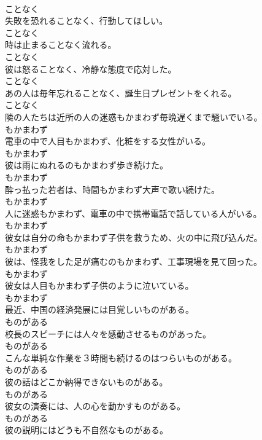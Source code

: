 \documentclass[8pt]{extreport}
\begin{document}
\begin{CJK}{UTF8}{min}
\\	ことなく
\\	失敗を恐れることなく、行動してほしい。	
\\	ことなく
\\	時は止まることなく流れる。	
\\	ことなく
\\	彼は怒ることなく、冷静な態度で応対した。	
\\	ことなく
\\	あの人は毎年忘れることなく、誕生日プレゼントをくれる。	
\\	ことなく
\\	隣の人たちは近所の人の迷惑もかまわず毎晩遅くまで騒いでいる。	
\\	もかまわず
\\	電車の中で人目もかまわず、化粧をする女性がいる。	
\\	もかまわず
\\	彼は雨にぬれるのもかまわず歩き続けた。	
\\	もかまわず
\\	酔っ払った若者は、時間もかまわず大声で歌い続けた。	
\\	もかまわず
\\	人に迷惑もかまわず、電車の中で携帯電話で話している人がいる。	
\\	もかまわず
\\	彼女は自分の命もかまわず子供を救うため、火の中に飛び込んだ。	
\\	もかまわず
\\	彼は、怪我をした足が痛むのもかまわず、工事現場を見て回った。	
\\	もかまわず
\\	彼女は人目もかまわず子供のように泣いている。	
\\	もかまわず
\\	最近、中国の経済発展には目覚しいものがある。	
\\	ものがある
\\	校長のスピーチには人々を感動させるものがあった。	
\\	ものがある
\\	こんな単純な作業を３時間も続けるのはつらいものがある。	
\\	ものがある
\\	彼の話はどこか納得できないものがある。	
\\	ものがある
\\	彼女の演奏には、人の心を動かすものがある。	
\\	ものがある
\\	彼の説明にはどうも不自然なものがある。	

\end{CJK}
\end{document}

